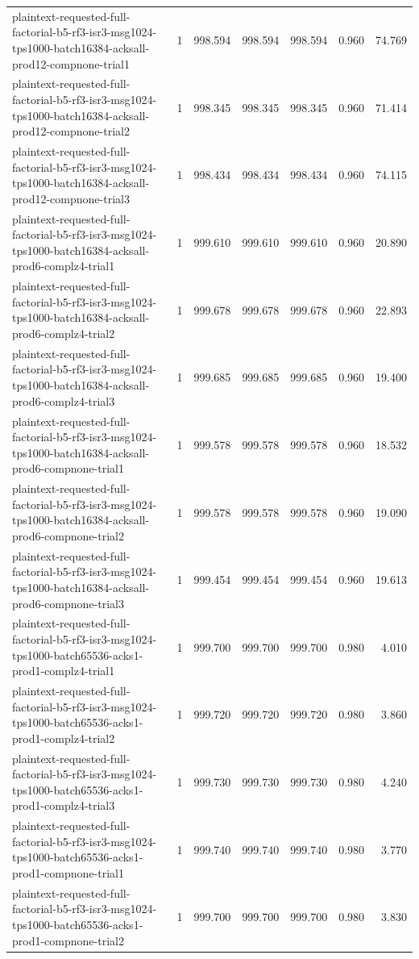 \begin{tabular}{lrrrrrr}
plaintext-requested-full-factorial-b5-rf3-isr3-msg1024-tps1000-batch16384-acksall-prod12-compnone-trial1 & 1 & 998.594 & 998.594 & 998.594 & 0.960 & 74.769 \\
plaintext-requested-full-factorial-b5-rf3-isr3-msg1024-tps1000-batch16384-acksall-prod12-compnone-trial2 & 1 & 998.345 & 998.345 & 998.345 & 0.960 & 71.414 \\
plaintext-requested-full-factorial-b5-rf3-isr3-msg1024-tps1000-batch16384-acksall-prod12-compnone-trial3 & 1 & 998.434 & 998.434 & 998.434 & 0.960 & 74.115 \\
plaintext-requested-full-factorial-b5-rf3-isr3-msg1024-tps1000-batch16384-acksall-prod6-complz4-trial1 & 1 & 999.610 & 999.610 & 999.610 & 0.960 & 20.890 \\
plaintext-requested-full-factorial-b5-rf3-isr3-msg1024-tps1000-batch16384-acksall-prod6-complz4-trial2 & 1 & 999.678 & 999.678 & 999.678 & 0.960 & 22.893 \\
plaintext-requested-full-factorial-b5-rf3-isr3-msg1024-tps1000-batch16384-acksall-prod6-complz4-trial3 & 1 & 999.685 & 999.685 & 999.685 & 0.960 & 19.400 \\
plaintext-requested-full-factorial-b5-rf3-isr3-msg1024-tps1000-batch16384-acksall-prod6-compnone-trial1 & 1 & 999.578 & 999.578 & 999.578 & 0.960 & 18.532 \\
plaintext-requested-full-factorial-b5-rf3-isr3-msg1024-tps1000-batch16384-acksall-prod6-compnone-trial2 & 1 & 999.578 & 999.578 & 999.578 & 0.960 & 19.090 \\
plaintext-requested-full-factorial-b5-rf3-isr3-msg1024-tps1000-batch16384-acksall-prod6-compnone-trial3 & 1 & 999.454 & 999.454 & 999.454 & 0.960 & 19.613 \\
plaintext-requested-full-factorial-b5-rf3-isr3-msg1024-tps1000-batch65536-acks1-prod1-complz4-trial1 & 1 & 999.700 & 999.700 & 999.700 & 0.980 & 4.010 \\
plaintext-requested-full-factorial-b5-rf3-isr3-msg1024-tps1000-batch65536-acks1-prod1-complz4-trial2 & 1 & 999.720 & 999.720 & 999.720 & 0.980 & 3.860 \\
plaintext-requested-full-factorial-b5-rf3-isr3-msg1024-tps1000-batch65536-acks1-prod1-complz4-trial3 & 1 & 999.730 & 999.730 & 999.730 & 0.980 & 4.240 \\
plaintext-requested-full-factorial-b5-rf3-isr3-msg1024-tps1000-batch65536-acks1-prod1-compnone-trial1 & 1 & 999.740 & 999.740 & 999.740 & 0.980 & 3.770 \\
plaintext-requested-full-factorial-b5-rf3-isr3-msg1024-tps1000-batch65536-acks1-prod1-compnone-trial2 & 1 & 999.700 & 999.700 & 999.700 & 0.980 & 3.830 \\

\end{tabular}
